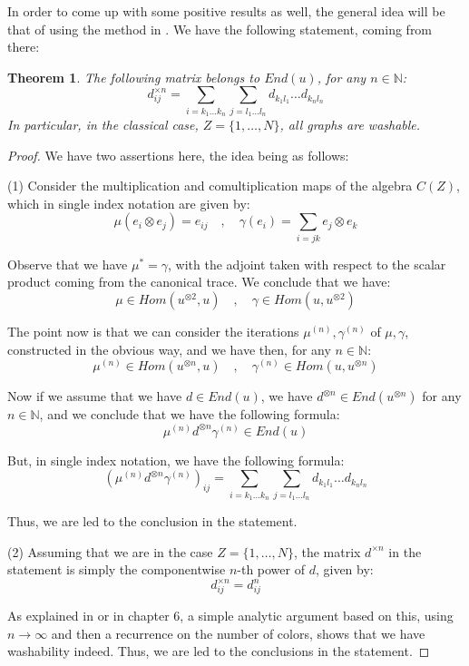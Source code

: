 \documentclass[12pt]{amsbook}
\newtheorem{theorem}{Theorem}[chapter]
\begin{document}
In order to come up with some positive results as well, the general idea will be that of using the method in \cite{ba2}. We have the following statement, coming from there:

\begin{theorem}
The following matrix belongs to $End(u)$, for any $n\in\mathbb N$:
$$d^{\times n}_{ij}=\sum_{i=k_1\ldots k_n}\sum_{j=l_1\ldots l_n}d_{k_1l_1}\ldots d_{k_nl_n}$$
In particular, in the classical case, $Z=\{1,\ldots,N\}$, all graphs are washable.
\end{theorem}

\begin{proof}
We have two assertions here, the idea being as follows:

\medskip

(1) Consider the multiplication and comultiplication maps of the algebra $C(Z)$, which in single index notation are given by:
$$\mu(e_i\otimes e_j)=e_{ij}\quad,\quad 
\gamma(e_i)=\sum_{i=jk}e_j\otimes e_k$$

Observe that we have $\mu^*=\gamma$, with the adjoint taken with respect to the scalar product coming from the canonical trace. We conclude that we have:
$$\mu\in Hom(u^{\otimes 2},u)\quad,\quad 
\gamma\in Hom(u,u^{\otimes 2})$$

The point now is that we can consider the iterations $\mu^{(n)},\gamma^{(n)}$ of $\mu,\gamma$, constructed in the obvious way, and we have then, for any $n\in\mathbb N$:
$$\mu^{(n)}\in Hom(u^{\otimes n},u)\quad,\quad 
\gamma^{(n)}\in Hom(u,u^{\otimes n})$$

Now if we assume that we have $d\in End(u)$, we have $d^{\otimes n}\in End(u^{\otimes n})$ for any $n\in\mathbb N$, and we conclude that we have the following formula:
$$\mu^{(n)}d^{\otimes n}\gamma^{(n)}\in End(u)$$

But, in single index notation, we have the following formula:
$$(\mu^{(n)}d^{\otimes n}\gamma^{(n)})_{ij}=\sum_{i=k_1\ldots k_n}\sum_{j=l_1\ldots l_n}d_{k_1l_1}\ldots d_{k_nl_n}$$

Thus, we are led to the conclusion in the statement.

\medskip

(2) Assuming that we are in the case $Z=\{1,\ldots,N\}$, the matrix $d^{\times n}$ in the statement is simply the componentwise $n$-th power of $d$, given by:
$$d^{\times n}_{ij}=d_{ij}^n$$ 

As explained in \cite{ba2} or in chapter 6, a simple analytic argument based on this, using $n\to\infty$ and then a recurrence on the number of colors, shows that we have washability indeed. Thus, we are led to the conclusions in the statement.
\end{proof}
\end{document}
